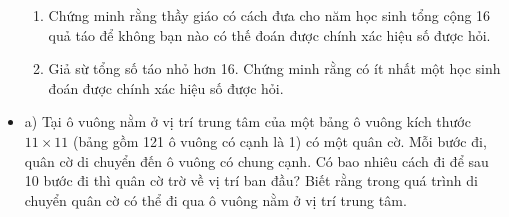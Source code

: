 \documentclass[11pt]{scrartcl}
\begin{document}
\begin{itemize}[label=, leftmargin=0em, itemsep=-0em]
\begin{btvn}
        \begin{enumerate}[label=(\alph*)]
            \item Chứng minh rằng thầy giáo có cách đưa cho năm học sinh tổng cộng 16 quả táo để không bạn nào có thế đoán được chính xác hiệu số được hỏi.
            \item Giả sừ tổng số táo nhỏ hơn 16. Chứng minh rằng có ít nhất một học sinh đoán được chính xác hiệu số được hỏi.
        \end{enumerate}
    \end{btvn}
    \item \begin{btvn} a) Tại ô vuông nằm ở vị trí trung tâm của một bảng ô vuông kích thước $11 \times 11$ (bảng gồm 121 ô vuông có cạnh là 1) có một quân cờ. Mỗi bước đi, quân cờ di chuyển đến ô vuông có chung cạnh. Có bao nhiêu cách đi để sau 10 bước đi thì quân cờ trờ về vị trí ban đầu? Biết rằng trong quá trình di chuyển quân cờ có thể đi qua ô vuông nằm ở vị trí trung tâm.
    


\end{btvn}
\end{itemize}
\end{document}
